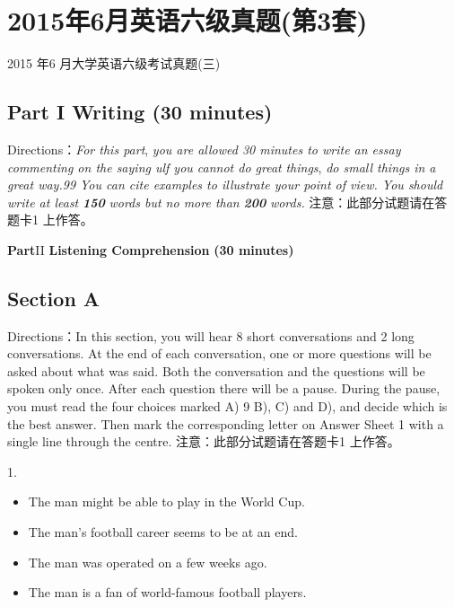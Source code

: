 \documentclass[UTF8,11pt]{ctexart}
\begin{document}
\section*{2015年6月英语六级真题(第3套)}
2015 年6 月大学英语六级考试真题(三)


\subsection*{\textbf{Part I} \textbf{Writing} \textbf{(30 minutes)}}


Directions：\textit{For this part},\textit{ you are allowed 30 minutes to write an essay commenting on the saying ulf you cannot do great} \textit{things},\textit{ do small things in a great way.99 You can cite examples to illustrate your point of view. You should write at least} \textbf{\textit{150}} \textit{words but no more than}\textbf{\textit{ 200}}\textit{ words.} 注意：此部分试题请在答题卡1 上作答。


\textbf{Part}II \textbf{Listening Comprehension} \textbf{(30 minutes)}


\subsection*{\textbf{Section A}}


Directions：In this section, you will hear 8 short conversations and 2 long conversations. At the end of each conversation, one or more questions will be asked about what was said. Both the conversation and the questions will be spoken only once. After each question there will be a pause. During the pause, you must read the four choices marked A) 9 B), C) and D), and decide which is the best answer. Then mark the corresponding letter on Answer Sheet 1 with a single line through the centre. 注意：此部分试题请在答题卡1 上作答。


1.


\begin{itemize}[leftmargin=2em,itemsep=.2em,topsep=.4em]\item[A.] The man might be able to play in the World Cup.
\end{itemize}

\begin{itemize}[leftmargin=2em,itemsep=.2em,topsep=.4em]\item[B.] The man’s football career seems to be at an end.
\item[C.] The man was operated on a few weeks ago.
\item[D.] The man is a fan of world-famous football players.
\end{itemize}
\end{document}
